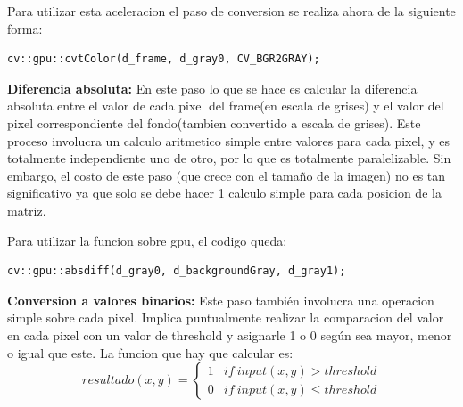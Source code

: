 \documentclass[a4paper,10pt]{report}
\begin{document}
Para utilizar esta aceleracion el paso de conversion se realiza ahora de la siguiente forma:

\begin{lstlisting}[columns=flexible,basicstyle=\ttfamily\small\bfseries]
    cv::gpu::cvtColor(d_frame, d_gray0, CV_BGR2GRAY);
\end{lstlisting}



 
 \textbf{ Diferencia absoluta:} En este paso lo que se hace es calcular la diferencia absoluta entre el valor de cada pixel del frame(en escala de grises) y el valor del pixel correspondiente del fondo(tambien convertido a escala de grises). 
 Este proceso involucra un calculo aritmetico simple entre valores para cada pixel, y es totalmente independiente uno de otro, por lo que es totalmente paralelizable. 
 Sin embargo, el costo de este paso (que crece con el tamaño de la imagen) no es tan significativo ya que solo se debe hacer 1 calculo simple para cada posicion de la matriz.
 
 Para utilizar la funcion sobre gpu, el codigo queda:
\begin{lstlisting}[columns=flexible,basicstyle=\ttfamily\small\bfseries]
    cv::gpu::absdiff(d_gray0, d_backgroundGray, d_gray1);
\end{lstlisting}





 \textbf{Conversion a valores binarios:}  Este paso también involucra una operacion simple sobre cada pixel. 
 Implica puntualmente realizar la comparacion del valor en cada pixel con un valor de threshold y asignarle 1 o 0 según sea mayor, menor o igual que este.
 La funcion que hay que calcular es: 
 \begin{displaymath}
   resultado(x,y) = \left\{
     \begin{array}{lr}
       1 &  if\ input(x,y) > threshold\\
       0 &  if\ input(x,y) \leq threshold
     \end{array}
   \right.
\end{displaymath} 

\end{document}
